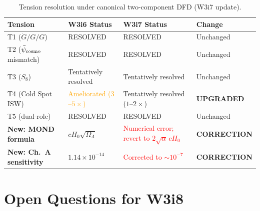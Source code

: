 \documentclass[11pt]{article}
\newcommand{\ee}[1]{\times 10^{#1}}
\newcommand{\psicosmo}{\bar{\psi}_{\rm cosmo}}
\newcommand{\Gdot}{\dot{G}/G}
\newcommand{\Hzero}{H_0}
\begin{document}
\begin{table}[H]
\centering
\caption{Tension resolution under canonical two-component DFD (W3i7 update).}
\label{tab:tensions-W3i7}
\begin{tabular}{llll}
\toprule
\textbf{Tension} & \textbf{W3i6 Status} & \textbf{W3i7 Status} & \textbf{Change} \\
\midrule
T1 ($\Gdot/G$) & \textcolor{green!50!black}{RESOLVED} &
  \textcolor{green!50!black}{RESOLVED} & Unchanged \\
T2 ($\psicosmo$ mismatch) & \textcolor{green!50!black}{RESOLVED} &
  \textcolor{green!50!black}{RESOLVED} & Unchanged \\
T3 ($S_8$) & \textcolor{green!50!black}{Tentatively resolved} &
  \textcolor{green!50!black}{Tentatively resolved} & Unchanged \\
T4 (Cold Spot ISW) & \textcolor{orange}{Ameliorated ($3$--$5\times$)} &
  \textcolor{green!50!black}{Tentatively resolved ($1$--$2\times$)} &
  \textbf{UPGRADED} \\
T5 (dual-role) & \textcolor{green!50!black}{RESOLVED} &
  \textcolor{green!50!black}{RESOLVED} & Unchanged \\
\addlinespace
\textbf{New: MOND formula} & $c\Hzero\sqrt{\Omega_\Lambda}$ &
  \textcolor{red}{Numerical error; revert to $2\sqrt{\alpha}\,c\Hzero$} &
  \textbf{CORRECTION} \\
\textbf{New: Ch.~A sensitivity} & $1.14\ee{-14}$ &
  \textcolor{red}{Corrected to $\sim 10^{-7}$} &
  \textbf{CORRECTION} \\
\bottomrule
\end{tabular}
\end{table}

\section{Open Questions for W3i8}
\label{sec:open-W3i8}
\end{document}
